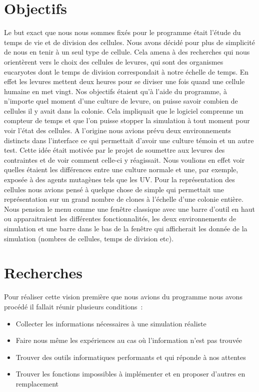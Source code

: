 \section{Objectifs}
Le but exact que nous nous sommes fixés pour le programme était l’étude du temps de vie et de division des cellules. Nous avons décidé pour plus de simplicité de nous en tenir à un seul type de cellule. Cela amena à des recherches qui nous orientèrent vers le choix des cellules de levures, qui sont des organismes eucaryotes dont le temps de division correspondait à notre échelle de temps. En effet les levures mettent deux heures pour se diviser une fois quand une cellule humaine en met vingt. Nos objectifs étaient qu’à l’aide du programme, à n’importe quel moment d’une culture de levure, on puisse savoir combien de cellules il y avait dans la colonie. Cela impliquait que le logiciel comprenne un compteur de temps et que l’on puisse stopper la simulation à tout moment pour voir l’état des cellules. A l’origine nous avions prévu deux environnements distincts dans l’interface ce qui permettait d’avoir une culture témoin et un autre test. Cette idée était motivée par le projet de soumettre aux levures des contraintes et de voir comment celle-ci y réagissait. Nous voulions en effet voir quelles étaient les différences entre une culture normale et une, par exemple, exposée à des agents mutagènes tels que les UV. Pour la représentation des cellules nous avions pensé à quelque chose de simple qui permettait une représentation sur un grand nombre de clones à l’échelle d’une colonie entière. Nous pension le menu comme une fenêtre classique avec une barre d’outil en haut ou apparaitraient les différentes fonctionnalités, les deux environnements de simulation et une barre dans le bas de la fenêtre qui afficherait les donnée de la simulation (nombres de cellules, temps de division etc). \\

\section{Recherches}

Pour réaliser cette vision première que nous avions du programme nous avons procédé il fallait réunir plusieurs conditions : 

\begin{itemize}
  \item Collecter les informations nécessaires à une simulation réaliste
  \item Faire nous même les expériences au cas où l’information n’est pas trouvée
  \item Trouver des outils informatiques performants et qui réponde à nos attentes 
  \item Trouver les fonctions impossibles à implémenter et en proposer d’autres en remplacement
\end{itemize}

